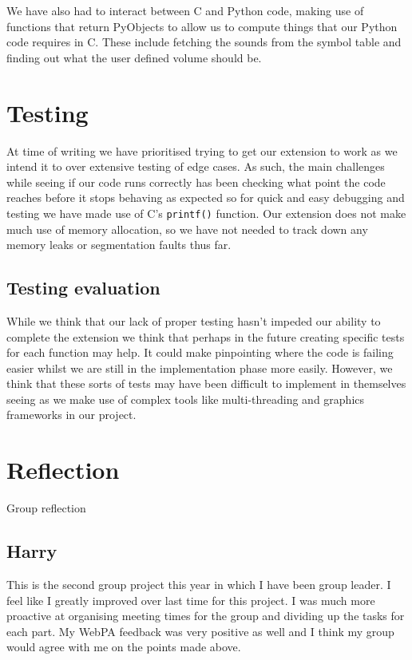 \documentclass[11pt]{article}
\begin{document}
	We have also had to interact between C and Python code, making use of functions that return PyObjects to allow us to compute things that our Python code requires in C. These include fetching the sounds from the symbol table and finding out what the user defined volume should be.

\section{Testing}
	At time of writing we have prioritised trying to get our extension to work as we intend it to over extensive testing of edge cases. As such, the main challenges while seeing if our code runs correctly has been checking what point the code reaches before it stops behaving as expected so for quick and easy debugging and testing we have made use of C's  \texttt{printf()} function. Our extension does not make much use of memory allocation, so we have not needed to track down any memory leaks or segmentation faults thus far.

\subsection{Testing evaluation}
While we think that our lack of proper testing hasn't impeded our ability to complete the extension we think that perhaps in the future creating specific tests for each function may help. It could make pinpointing where the code is failing easier whilst we are still in the implementation phase more easily. However, we think that these sorts of tests may have been difficult to implement in themselves seeing as we make use of complex tools like multi-threading and graphics frameworks in our project.

\section{Reflection}
Group reflection

\subsection{Harry}
This is the second group project this year in which I have been group leader. I feel like I greatly improved over last time for this project. I was much more proactive at organising meeting times for the group and dividing up the tasks for each part. My WebPA feedback was very positive as well and I think my group would agree with me on the points made above.\\
\end{document}
